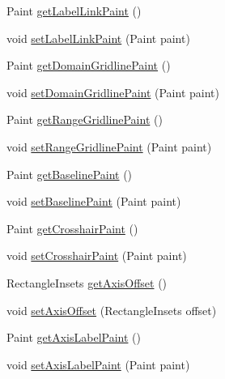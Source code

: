 \begin{DoxyCompactItemize}
\item 
Paint \mbox{\hyperlink{classorg_1_1jfree_1_1chart_1_1_standard_chart_theme_a0e4aeb2f6b194d7a09d2fbcaa222eb8a}{get\+Label\+Link\+Paint}} ()
\item 
void \mbox{\hyperlink{classorg_1_1jfree_1_1chart_1_1_standard_chart_theme_ac48a6a4060505c5f9627aa0c10e3da42}{set\+Label\+Link\+Paint}} (Paint paint)
\item 
Paint \mbox{\hyperlink{classorg_1_1jfree_1_1chart_1_1_standard_chart_theme_a5061819d22f9e7d6f091160fd276396e}{get\+Domain\+Gridline\+Paint}} ()
\item 
void \mbox{\hyperlink{classorg_1_1jfree_1_1chart_1_1_standard_chart_theme_a4dbda23eca8a76a55f4db9732e2b8957}{set\+Domain\+Gridline\+Paint}} (Paint paint)
\item 
Paint \mbox{\hyperlink{classorg_1_1jfree_1_1chart_1_1_standard_chart_theme_a8f0db366a4b79b42137e65498d23e41f}{get\+Range\+Gridline\+Paint}} ()
\item 
void \mbox{\hyperlink{classorg_1_1jfree_1_1chart_1_1_standard_chart_theme_a86328e314e2d0195033b5cae639f141f}{set\+Range\+Gridline\+Paint}} (Paint paint)
\item 
Paint \mbox{\hyperlink{classorg_1_1jfree_1_1chart_1_1_standard_chart_theme_ac6f4811b0f2f544ba0c6b8a2792dd3ff}{get\+Baseline\+Paint}} ()
\item 
void \mbox{\hyperlink{classorg_1_1jfree_1_1chart_1_1_standard_chart_theme_af1e3ace3875efbd18d3505835ddcce5a}{set\+Baseline\+Paint}} (Paint paint)
\item 
Paint \mbox{\hyperlink{classorg_1_1jfree_1_1chart_1_1_standard_chart_theme_a61ddecaff890ba1c388ae21f883931d4}{get\+Crosshair\+Paint}} ()
\item 
void \mbox{\hyperlink{classorg_1_1jfree_1_1chart_1_1_standard_chart_theme_a6e79ffa1bd9080dcc334f9cd3cb4821a}{set\+Crosshair\+Paint}} (Paint paint)
\item 
Rectangle\+Insets \mbox{\hyperlink{classorg_1_1jfree_1_1chart_1_1_standard_chart_theme_a29b114f43a2036250c24fc8544e95282}{get\+Axis\+Offset}} ()
\item 
void \mbox{\hyperlink{classorg_1_1jfree_1_1chart_1_1_standard_chart_theme_a763e33e247502dfb414be9d1052b8f00}{set\+Axis\+Offset}} (Rectangle\+Insets offset)
\item 
Paint \mbox{\hyperlink{classorg_1_1jfree_1_1chart_1_1_standard_chart_theme_a1aa86cdb01a8291e444a919d1419f40e}{get\+Axis\+Label\+Paint}} ()
\item 
void \mbox{\hyperlink{classorg_1_1jfree_1_1chart_1_1_standard_chart_theme_a905484deb0fc0cac980df62d3265698b}{set\+Axis\+Label\+Paint}} (Paint paint)

\end{DoxyCompactItemize}
